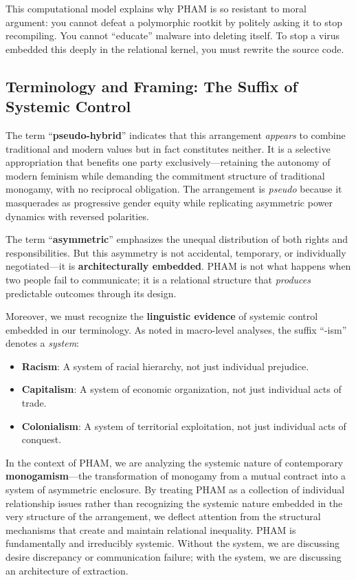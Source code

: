 \documentclass[12pt,openany]{book}
\numberwithin{equation}{chapter}
\begin{document}
This computational model explains why PHAM is so resistant to moral argument: you cannot defeat a polymorphic rootkit by politely asking it to stop recompiling. You cannot ``educate'' malware into deleting itself. To stop a virus embedded this deeply in the relational kernel, you must rewrite the source code.

\subsection{Terminology and Framing: The Suffix of Systemic Control}

The term ``\textbf{pseudo-hybrid}'' indicates that this arrangement \textit{appears} to combine traditional and modern values but in fact constitutes neither. It is a selective appropriation that benefits one party exclusively---retaining the autonomy of modern feminism while demanding the commitment structure of traditional monogamy, with no reciprocal obligation. The arrangement is \textit{pseudo} because it masquerades as progressive gender equity while replicating asymmetric power dynamics with reversed polarities.

The term ``\textbf{asymmetric}'' emphasizes the unequal distribution of both rights and responsibilities. But this asymmetry is not accidental, temporary, or individually negotiated---it is \textbf{architecturally embedded}. PHAM is not what happens when two people fail to communicate; it is a relational structure that \textit{produces} predictable outcomes through its design.

Moreover, we must recognize the \textbf{linguistic evidence} of systemic control embedded in our terminology. As noted in macro-level analyses, the suffix ``-ism'' denotes a \textit{system}:
\begin{itemize}
    \item \textbf{Racism}: A system of racial hierarchy, not just individual prejudice.
    \item \textbf{Capitalism}: A system of economic organization, not just individual acts of trade.
    \item \textbf{Colonialism}: A system of territorial exploitation, not just individual acts of conquest.
\end{itemize}

In the context of PHAM, we are analyzing the systemic nature of contemporary \textbf{monogamism}---the transformation of monogamy from a mutual contract into a system of asymmetric enclosure. By treating PHAM as a collection of individual relationship issues rather than recognizing the systemic nature embedded in the very structure of the arrangement, we deflect attention from the structural mechanisms that create and maintain relational inequality. PHAM is fundamentally and irreducibly systemic. Without the system, we are discussing desire discrepancy or communication failure; with the system, we are discussing an architecture of extraction.
\end{document}
